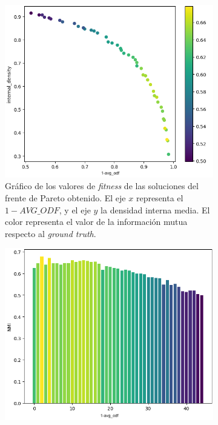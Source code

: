 \begin{figure}[!htb]
  \centering
  \begin{subfigure}{.48\textwidth}
    \centering
    \includegraphics[width=\linewidth]{img/3_nmi_pareto_1}
    \caption{Gráfico de los valores de \emph{fitness} de las soluciones del
    frente de Pareto obtenido. El eje $x$ representa el \(1-AVG\_ODF\), y el
    eje \(y\) la densidad interna media. El color representa el valor de la
    información mutua respecto al \emph{ground truth}.}
    \label{fig:3-pareto-nmi-1}
  \end{subfigure}%
  \hfill
  \begin{subfigure}{.48\textwidth}
    \centering
    \includegraphics[width=\linewidth]{img/3_nmi_pareto_2}

\end{subfigure}
\end{figure}
